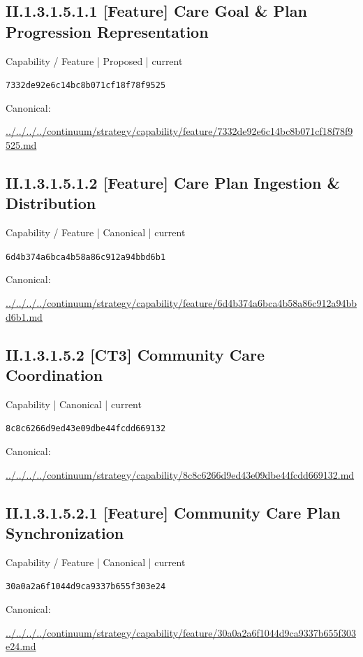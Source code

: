 \documentclass[10pt,a4paper]{article}
\begin{document}
\subsection*{II.1.3.1.5.1.1 [Feature] Care Goal \& Plan Progression Representation}
{\small Capability / Feature | Proposed | current}\par
\texttt{7332de92e6c14bc8b071cf18f78f9525}\par
Canonical: \par
{\footnotesize\url{../../../../continuum/strategy/capability/feature/7332de92e6c14bc8b071cf18f78f9525.md}}\par
\subsection*{II.1.3.1.5.1.2 [Feature] Care Plan Ingestion \& Distribution}
{\small Capability / Feature | Canonical | current}\par
\texttt{6d4b374a6bca4b58a86c912a94bbd6b1}\par
Canonical: \par
{\footnotesize\url{../../../../continuum/strategy/capability/feature/6d4b374a6bca4b58a86c912a94bbd6b1.md}}\par
\subsection*{II.1.3.1.5.2 [CT3] Community Care Coordination}
{\small Capability | Canonical | current}\par
\texttt{8c8c6266d9ed43e09dbe44fcdd669132}\par
Canonical: \par
{\footnotesize\url{../../../../continuum/strategy/capability/8c8c6266d9ed43e09dbe44fcdd669132.md}}\par
\subsection*{II.1.3.1.5.2.1 [Feature] Community Care Plan Synchronization}
{\small Capability / Feature | Canonical | current}\par
\texttt{30a0a2a6f1044d9ca9337b655f303e24}\par
Canonical: \par
{\footnotesize\url{../../../../continuum/strategy/capability/feature/30a0a2a6f1044d9ca9337b655f303e24.md}}\par
\end{document}
